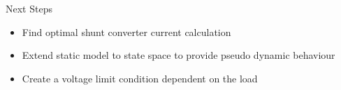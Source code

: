\begin{frame}{Next Steps}
    \begin{itemize}
        \item Find optimal shunt converter current calculation
        \item Extend static model to state space to provide pseudo dynamic behaviour
        \item Create a voltage limit condition dependent on the load
    \end{itemize}
\end{frame}




